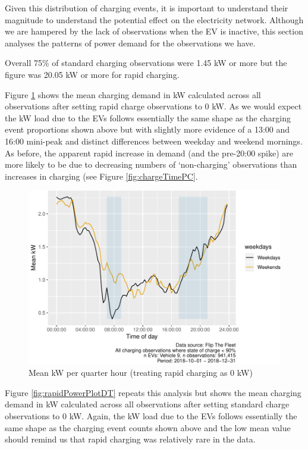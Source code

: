 \documentclass[]{article}
\begin{document}
Given this distribution of charging events, it is important to understand their magnitude to understand the potential effect on the electricity network. Although we are hampered by the lack of observations when the EV is inactive, this section analyses the patterns of power demand for the observations we have.

Overall 75\% of standard charging observations were 1.45 kW or more but the figure was 20.05 kW or more for rapid charging.

Figure \ref{fig:nonRapidPowerPlotDT} shows the mean charging demand in kW calculated across all observations after setting rapid charge observations to 0 kW. As we would expect the kW load due to the EVs follows essentially the same shape as the charging event proportions shown above but with slightly more evidence of a 13:00 and 16:00 mini-peak and distinct differences between weekday and weekend mornings. As before, the apparent rapid increase in demand (and the pre-20:00 spike) are more likely to be due to decreasing numbers of `non-charging' observations than increases in charging (see Figure \ref{fig:chargeTimePC}.

\begin{figure}
\centering
\includegraphics{EVBB_report_v1_files/figure-latex/nonRapidPowerPlotDT-1.pdf}
\caption{\label{fig:nonRapidPowerPlotDT}Mean kW per quarter hour (treating rapid charging as 0 kW)}
\end{figure}

Figure \ref{fig:rapidPowerPlotDT} repeats this analysis but shows the mean charging demand in kW calculated across all observations after setting standard charge observations to 0 kW. Again, the kW load due to the EVs follows essentially the same shape as the charging event counts shown above and the low mean value should remind us that rapid charging was relatively rare in the data.
\end{document}
